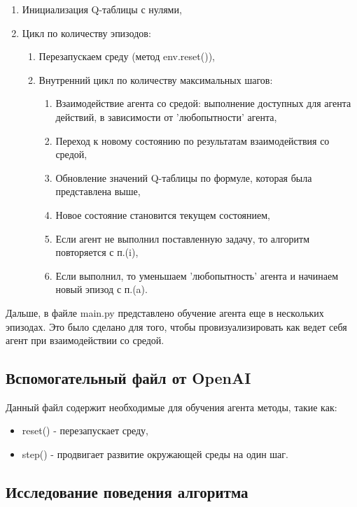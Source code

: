 \documentclass[a4paper]{report}
\theoremstyle{definition}
\theoremstyle{plain}
\theoremstyle{remark}
\theoremstyle{remark}
\theoremstyle{definition}
\begin{document}
\begin{enumerate}
    \item Инициализация Q-таблицы с нулями,
    \item Цикл по количеству эпизодов:
    \begin{enumerate}
        \item Перезапускаем среду (метод env.reset()),
        \item Внутренний цикл по количеству максимальных шагов:
        \begin{enumerate}
            \item Взаимодействие агента со средой: выполнение доступных для агента действий, в зависимости от 'любопытности' агента,
            \item Переход к новому состоянию по результатам взаимодействия со средой,
            \item Обновление значений Q-таблицы по формуле, которая была представлена выше,
            \item Новое состояние становится текущем состоянием,
            \item Если агент не выполнил поставленную задачу, то алгоритм повторяется с п.(i),
            \item Если выполнил, то уменьшаем 'любопытность' агента и начинаем новый эпизод с п.(a).
        \end{enumerate}
    \end{enumerate}
\end{enumerate}

Дальше, в файле main.py представлено обучение агента еще в нескольких эпизодах. Это было сделано для того, чтобы провизуализировать как ведет себя агент при взаимодействии со средой.
\begin{center}
    \subsection{Вспомогательный файл от OpenAI}
\end{center}
Данный файл содержит необходимые для обучения агента методы, такие как:
\begin{itemize}
    \item reset() - перезапускает среду,
    \item step() - продвигает развитие окружающей среды на один шаг.
\end{itemize}

\newpage
\begin{center}
\section{Исследование поведения алгоритма}
\end{center}
\end{document}
